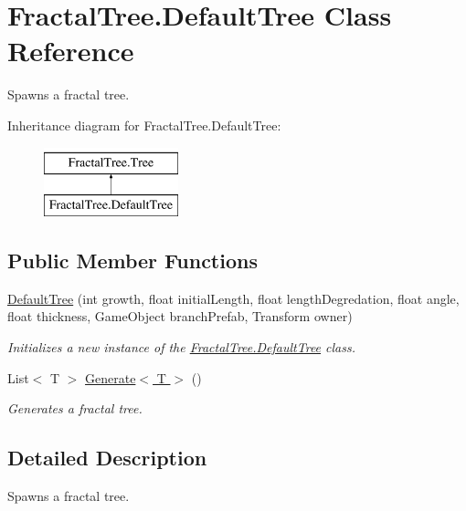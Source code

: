 \hypertarget{class_fractal_tree_1_1_default_tree}{}\section{Fractal\+Tree.\+Default\+Tree Class Reference}
\label{class_fractal_tree_1_1_default_tree}


Spawns a fractal tree.  


Inheritance diagram for Fractal\+Tree.\+Default\+Tree\+:\begin{figure}[H]
\begin{center}
\leavevmode
\includegraphics[height=2.000000cm]{class_fractal_tree_1_1_default_tree}
\end{center}
\end{figure}
\subsection*{Public Member Functions}
\begin{DoxyCompactItemize}
\item 
\hyperlink{class_fractal_tree_1_1_default_tree_a7d98ab8fa75e8e27681d632f4b3fd8d5}{Default\+Tree} (int growth, float initial\+Length, float length\+Degredation, float angle, float thickness, Game\+Object branch\+Prefab, Transform owner)
\begin{DoxyCompactList}\small\item\em Initializes a new instance of the \hyperlink{class_fractal_tree_1_1_default_tree}{Fractal\+Tree.\+Default\+Tree} class. \end{DoxyCompactList}\item 
List$<$ T $>$ \hyperlink{class_fractal_tree_1_1_default_tree_a99f8ba1f24ba5693f0981be567b236a0}{Generate$<$ T $>$} ()
\begin{DoxyCompactList}\small\item\em Generates a fractal tree. \end{DoxyCompactList}\end{DoxyCompactItemize}


\subsection{Detailed Description}
Spawns a fractal tree. 



